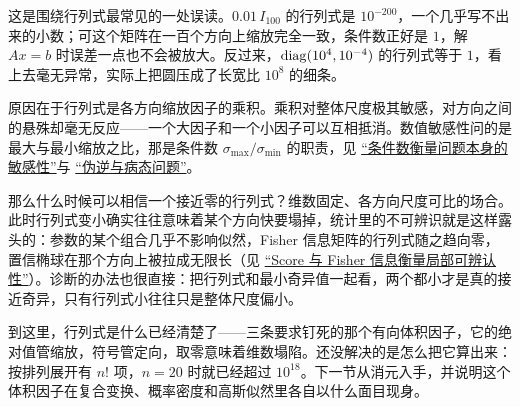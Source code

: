 这是围绕行列式最常见的一处误读。\(0.01\,I_{100}\) 的行列式是 \(10^{-200}\)，一个几乎写不出来的小数；可这个矩阵在一百个方向上缩放完全一致，条件数正好是 \(1\)，解 \(Ax=b\) 时误差一点也不会被放大。反过来，\(\operatorname{diag}(10^{4},10^{-4})\) 的行列式等于 \(1\)，看上去毫无异常，实际上把圆压成了长宽比 \(10^{8}\) 的细条。

原因在于行列式是各方向缩放因子的乘积。乘积对整体尺度极其敏感，对方向之间的悬殊却毫无反应——一个大因子和一个小因子可以互相抵消。数值敏感性问的是最大与最小缩放之比，那是条件数 \(\sigma_{\max}/\sigma_{\min}\) 的职责，见 \hyperref[sec:08-Numerical-Analysis/01-Floating-Point-and-Error/03]{``条件数衡量问题本身的敏感性''}与 \hyperref[sec:03-Linear-Algebra/07-SVD-and-Data-Applications/02]{``伪逆与病态问题''}。

那么什么时候可以相信一个接近零的行列式？维数固定、各方向尺度可比的场合。此时行列式变小确实往往意味着某个方向快要塌掉，统计里的不可辨识就是这样露头的：参数的某个组合几乎不影响似然，Fisher 信息矩阵的行列式随之趋向零，置信椭球在那个方向上被拉成无限长（见 \hyperref[sec:11-Mathematical-Statistics/03-Sufficient-Statistics-and-Information/02]{``Score 与 Fisher 信息衡量局部可辨认性''}）。诊断的办法也很直接：把行列式和最小奇异值一起看，两个都小才是真的接近奇异，只有行列式小往往只是整体尺度偏小。

到这里，行列式是什么已经清楚了——三条要求钉死的那个有向体积因子，它的绝对值管缩放，符号管定向，取零意味着维数塌陷。还没解决的是怎么把它算出来：按排列展开有 \(n!\) 项，\(n=20\) 时就已经超过 \(10^{18}\)。下一节从消元入手，并说明这个体积因子在复合变换、概率密度和高斯似然里各自以什么面目现身。
